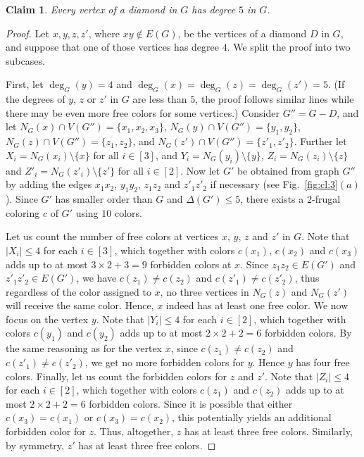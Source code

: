 \documentclass[11pt]{article}
\newtheorem{claim}{Claim}
\begin{document}
\begin{claim} \label{cl:3}
Every vertex of a diamond in $G$ has degree $5$ in $G$.
\end{claim} 
\begin{proof}
Let $x,y,z,z'$, where $xy \notin E(G)$, be the vertices of a diamond $D$ in $G$, and suppose that one of those vertices has degree $4$. We split the proof into two subcases.

First, let $\deg_G(y)=4$ and $\deg_G(x)=\deg_G(z)=\deg_G(z')=5$. (If the degrees of $y$, $z$ or $z'$ in $G$ are less than $5$, the proof follows similar lines while there may be even more free colors for some vertices.) Consider $G''=G-D$, and let $N_G(x) \cap V(G'')=\{x_1,x_2,x_3\}$, $N_G(y) \cap V(G'')=\{y_1,y_2\}$, $N_G(z) \cap V(G'')=\{z_1,z_2\}$, and $N_G(z') \cap V(G'')=\{z'_1,z'_2\}$. Further let $X_i=N_G(x_i)\setminus \{x\}$ for all $i\in[3]$, and $Y_i=N_G(y_i)\setminus \{y\}$, $Z_i=N_G(z_i)\setminus \{z\}$ and $Z'_i=N_G(z'_i)\setminus \{z'\}$ for all $i \in [2]$. Now let $G'$ be obtained from graph $G''$ by adding the edges $x_1x_2$, $y_1y_2$, $z_1z_2$ and $z'_1z'_2$ if necessary (see Fig.~\ref{fig:cl:3}$(a)$). Since $G'$ has smaller order than $G$ and $\Delta(G')\le 5$, there exists a $2$-frugal coloring $c$ of $G'$ using $10$ colors.

Let us count the number of free colors at vertices $x$, $y$, $z$ and $z'$ in $G$. Note that $|X_i| \le 4$ for each $i\in [3]$, which together with colors $c(x_1)$, $c(x_2)$ and $c(x_3)$ adds up to at most $3 \times 2 + 3=9$ forbidden colors at $x$. Since $z_1z_2 \in E(G')$ and $z'_1z'_2 \in E(G')$, we have $c(z_1) \ne c(z_2)$ and $c(z'_1) \ne c(z'_2)$, thus regardless of the color assigned to $x$, no three vertices in $N_G(z)$ and $N_G(z')$ will receive the same color. Hence, $x$ indeed has at least one free color. We now focus on the vertex $y$. Note that $|Y_i| \le 4$ for each $i\in [2]$, which together with colors $c(y_1)$ and $c(y_2)$ adds up to at most $2 \times 2 +2=6$ forbidden colors. By the same reasoning as for the vertex $x$, since $c(z_1) \ne c(z_2)$ and $c(z'_1) \ne c(z'_2)$, we get no more forbidden colors for $y$. Hence $y$ has four free colors. Finally, let us count the forbidden colors for $z$ and $z'$. Note that $|Z_i| \le 4$ for each $i\in [2]$, which together with colors $c(z_1)$ and $c(z_2)$ adds up to at most $2 \times 2 +2=6$ forbidden colors. Since it is possible that either $c(x_3)=c(x_1)$ or $c(x_3)=c(x_2)$, this potentially yields an additional forbidden color for $z$. Thus, altogether, $z$ has at least three free colors. Similarly, by symmetry, $z'$ has at least three free colors.


\end{proof}
\end{document}
